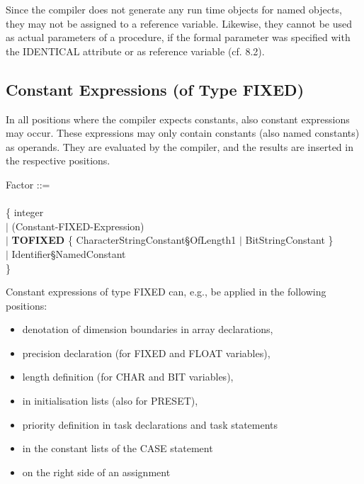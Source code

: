 \begin{tobedone}
Since the compiler does not generate any run time objects for named
objects, they may not be assigned to a reference variable. Likewise,
they cannot be used as actual parameters of a procedure, if the formal
parameter was specified with the IDENTICAL attribute or as reference
variable (cf. 8.2).

\subsection{Constant Expressions (of Type FIXED)}   %

In all positions where the compiler expects constants, also constant
expressions may occur. These expressions may only contain constants
(also named constants) as operands. They are evaluated by the compiler,
and the results are inserted in the respective positions.







\begin{front}
Factor ::=\\
\x [ + $\mid$ - ] \\
\x \{ integer \\
\x \x $\mid$ (Constant-FIXED-Expression)\\
\x \x $\mid$ {\bf TOFIXED} \{ CharacterStringConstant\S OfLength1 $\mid$ BitStringConstant \}\\
\x \x $\mid$ Identifier\S NamedConstant\\
\x \} \\
\end{front}
\begin{grammar}

\end{grammar}



Constant expressions of type FIXED can, e.g., be applied in the
following positions:
\begin{itemize}
\item denotation of dimension boundaries in array declarations,
\item precision declaration (for FIXED and FLOAT variables),
\item length definition (for CHAR and BIT variables),
\item in initialisation lists (also for PRESET),
\item priority definition in task declarations and task statements
\item in the constant lists of the CASE statement
\item on the right side of an assignment
\end{itemize}


\end{tobedone}
